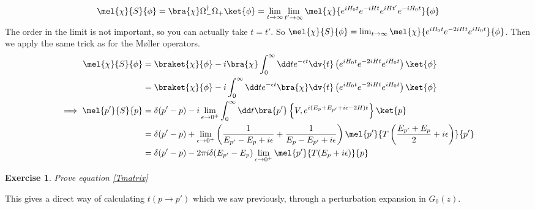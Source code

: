 \documentclass{article}
\newtheorem{exercise}{Exercise}[section]
\begin{document}
\[\mel{\chi}{S}{\phi}=\bra{\chi}\Omega_-^\dagger \Omega_+\ket{\phi} = \lim_{t\to \infty}\lim_{t'\to \infty} \mel{\chi}{e^{iH_0t}e^{-iHt}e^{iHt'}e^{-iH_0t}}{\phi}\]
The order in the limit is not important, so you can actually take $t=t'$. So $\mel{\chi}{S}{\phi} = \lim_{t\to\infty}\mel{\chi}{e^{iH_0t}e^{-2iHt}e^{iH_0t}}{\phi}$. Then we apply the same trick as for the M\o ller operators.
\begin{align}
\mel{\chi}{S}{\phi}&=\braket{\chi}{\phi}-i\bra{\chi}\int_0^\infty \dd t e^{-\epsilon t} \dv{t}\left(e^{iH_0t}e^{-2iHt}e^{iH_0t}\right)\ket{\phi}\\
&= \braket{\chi}{\phi}-i\int_0^\infty \dd t e^{-\epsilon t} \bra{\chi}\dv{t}\left(e^{iH_0t}e^{-2iHt}e^{iH_0t}\right)\ket{\phi}\\
\implies \mel{p'}{S}{p}&= \delta(p'-p)-i\lim_{\epsilon\to0^+}\int_0^\infty \dd t \bra{p'}\left\{V,e^{i(E_p+E_{p'}+i\epsilon-2H)t}\right\}\ket{p}\\
&= \delta(p'-p)+\lim_{\epsilon\to 0^+}\left(\frac{1}{E_{p'}-E_{p}+i\epsilon}+\frac{1}{E_{p}-E_{p'}+i\epsilon}\right)\mel{p'}{T\left(\frac{E_{p'}+E_p}{2}+i\epsilon\right)}{p'}\\
&= \delta(p'-p)-2\pi i \delta(E_{p'}-E_p)\lim_{\epsilon\to 0^+}\mel{p'}{T(E_p+i\epsilon)}{p}\label{Tmatrix}
\end{align}
\begin{exercise}Prove equation \eqref{Tmatrix}\end{exercise}
This gives a direct way of calculating $t(p\to p')$ which we saw previously, through a perturbation expansion in $G_0(z)$.

\pagebreak



\nocite{*}
\printbibliography
\end{document}
